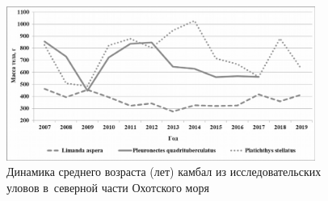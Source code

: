 \begin{figure}[h!]
  \begin{center}
    \includegraphics[width=0.9\textwidth]{authors/Byrlak-fig2.png}
  \end{center}
  \caption{Динамика среднего возраста (лет) камбал из исследовательских уловов в~северной части Охотского моря}
  \label{fig:byrlak-fig3}
\end{figure}
